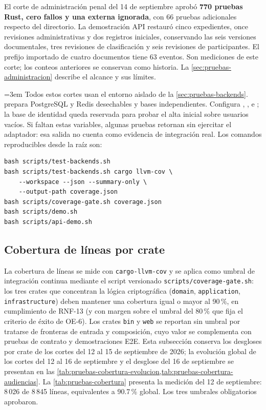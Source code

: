 El corte de administración penal del 14 de septiembre aprobó \textbf{770 pruebas Rust, cero fallos y una externa ignorada}, con 66 pruebas adicionales respecto del directorio. La demostración API restauró cinco expedientes, once revisiones administrativas y dos registros iniciales, conservando las seis versiones documentales, tres revisiones de clasificación y seis revisiones de participantes. El prefijo importado de cuatro documentos tiene 63 eventos. Son mediciones de este corte; los conteos anteriores se conservan como historia. La \cref{sec:pruebas-administracion} describe el alcance y sus límites.

{\emergencystretch=3em Todos estos cortes usan el entorno aislado de la \cref{sec:pruebas-backends}.  prepara PostgreSQL y Redis desechables y bases independientes. Configura , ,  e ; la base de identidad queda reservada para probar el alta inicial sobre usuarios vacíos. Si faltan estas variables, algunas pruebas retornan sin ejercitar el adaptador: esa salida no cuenta como evidencia de integración real. Los comandos reproducibles desde la raíz son:\par}

\begin{lstlisting}[numbers=none]
bash scripts/test-backends.sh
bash scripts/test-backends.sh cargo llvm-cov \
    --workspace --json --summary-only \
    --output-path coverage.json
bash scripts/coverage-gate.sh coverage.json
bash scripts/demo.sh
bash scripts/api-demo.sh
\end{lstlisting}

\subsection{Cobertura de líneas por crate}\label{sec:matriz-cobertura}

La cobertura de líneas se mide con \texttt{cargo-llvm-cov} y se aplica como umbral de integración continua mediante el script versionado \texttt{scripts/coverage-gate.sh}: los tres crates que concentran la lógica criptográfica (\texttt{domain}, \texttt{application}, \texttt{infrastructure}) deben mantener una cobertura igual o mayor al 90\,\%, en cumplimiento de RNF-13 (y con margen sobre el umbral del 80\,\% que fija el criterio de éxito de OE-6). Los crates \texttt{bin} y \texttt{web} se reportan sin umbral por tratarse de fronteras de entrada y composición, cuyo valor se complementa con pruebas de contrato y demostraciones E2E. Esta subsección conserva los desgloses por crate de los cortes del 12 al 15 de septiembre de 2026; la evolución global de los cortes del 12 al 16 de septiembre y el desglose del 16 de septiembre se presentan en las \cref{tab:pruebas-cobertura-evolucion,tab:pruebas-cobertura-audiencias}. La \cref{tab:pruebas-cobertura} presenta la medición del 12 de septiembre: 8\,026 de 8\,845 líneas, equivalentes a 90.7\,\% global. Los tres umbrales obligatorios aprobaron.

